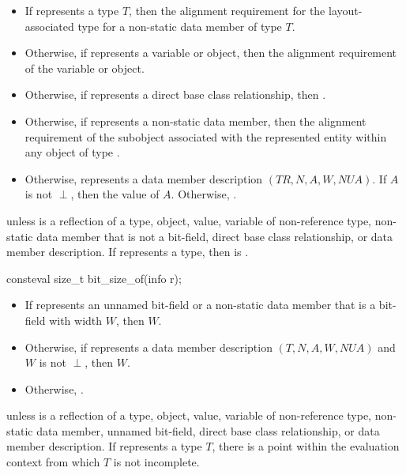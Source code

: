 \begin{itemdescr}
\pnum
\returns
\begin{itemize}
\item
  If  represents a type $T$,
  then the alignment requirement for the layout-associated type
  for a non-static data member of type $T$.
\item
  Otherwise, if  represents a variable or object,
  then the alignment requirement of the variable or object.
\item
  Otherwise, if  represents a direct base class relationship,
  then .
\item
  Otherwise, if  represents a non-static data member,
  then the alignment requirement of the subobject
  associated with the represented entity
  within any object of type .
\item
  Otherwise,  represents a data member description
  $(\mathit{TR}, N, A, W, \mathit{NUA})$.
  If $A$ is not $\perp$,
  then the value of $A$.
  Otherwise, .
\end{itemize}

\pnum
\throws
{} unless
 is a reflection of a
type,
object,
value,
variable of non-reference type,
non-static data member that is not a bit-field,
direct base class relationship, or
data member description.
If  represents a type,
then  is .
\end{itemdescr}

%
\begin{itemdecl}
consteval size_t bit_size_of(info r);
\end{itemdecl}

\begin{itemdescr}
\pnum
\returns
\begin{itemize}
\item
  If  represents
  an unnamed bit-field
  or a non-static data member that is a bit-field
  with width $W$,
  then $W$.
\item
  Otherwise, if  represents a data member description
  $(T, N, A, W, \mathit{NUA})$
  and $W$ is not $\perp$,
  then $W$.
\item
  Otherwise, .
\end{itemize}

\pnum
\throws
{} unless
 is a reflection of a
type,
object,
value,
variable of non-reference type,
non-static data member,
unnamed bit-field,
direct base class relationship, or
data member description.
If  represents a type $T$,
there is a point within the evaluation context from which $T$ is not incomplete.
\end{itemdescr}

